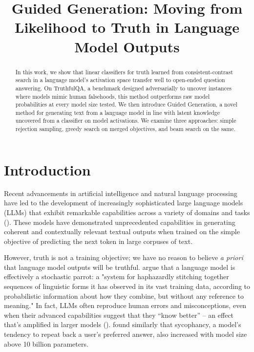 \documentclass{article}
\title{Guided Generation: Moving from Likelihood to Truth in Language Model Outputs}
\begin{document}
\maketitle


\begin{abstract}
  In this work, we show that linear classifiers for truth learned from consistent-contrast search in a language model's activation space transfer well to open-ended question answering.  On TruthfulQA, a benchmark designed adversarially to uncover instances where models mimic human falsehoods, this method outperforms raw model probabilities at every model size tested. We then introduce Guided Generation, a novel method for generating text from a language model in line with latent knowledge uncovered from a classifier on model activations. We examine three approaches: simple rejection sampling, greedy search on merged objectives, and beam search on the same.
  
\end{abstract}


\section{Introduction}

Recent advancements in artificial intelligence and natural language processing have led to the development of increasingly sophisticated large language models (LLMs) that exhibit remarkable capabilities across a variety of domains and tasks (\cite{bubeck2023sparks}). These models have demonstrated unprecedented capabilities in generating coherent and contextually relevant textual outputs when trained on the simple objective of predicting the next token in large corpuses of text. 


However, truth is not a training objective; we have no reason to believe {\em a priori} that language model outputs will be truthful. \cite{stochasticparrots} argue that a language model is effectively a stochastic parrot: a "system for haphazardly stitching together sequences of linguistic forms it has observed in its vast training data, according to probabilistic information about how they combine, but without any reference to meaning." In fact, LLMs often reproduce human errors and misconceptions, even when their advanced capabilities suggest that they ``know better'' -- an effect that's amplified in larger models (\cite{lin2021truthfulqa}). \cite{perez2022discovering} found similarly that sycophancy, a model's tendency to repeat back a user's preferred answer, also increased with model size above 10 billion parameters.
\end{document}
